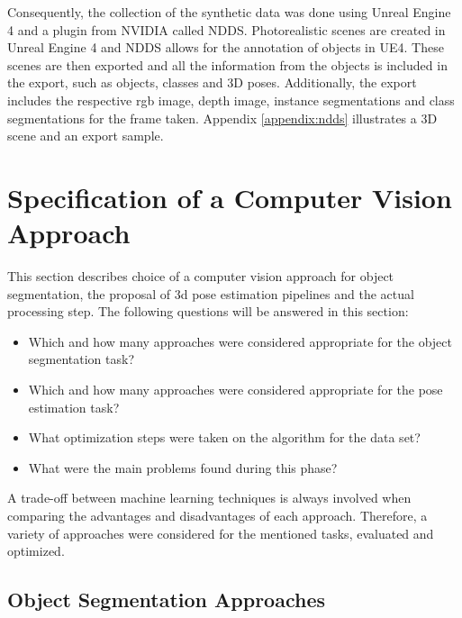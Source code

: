 Consequently, the collection of the synthetic data was done using Unreal Engine 4 and a plugin from NVIDIA\cite{2021ue4} called NDDS\cite{2021ndds}. Photorealistic scenes are created in Unreal Engine 4 and NDDS allows for the annotation of objects in UE4. These scenes are then exported and all the information from the objects is included in the export, such as objects, classes and 3D poses. Additionally, the export includes the respective rgb image, depth image, instance segmentations and class segmentations for the frame taken. Appendix \ref{appendix:ndds} illustrates a 3D scene and an export sample.

\section{Specification of a Computer Vision Approach}\label{chap:3:method}

This section describes choice of a computer vision approach for object segmentation, the proposal of 3d pose estimation pipelines and the actual processing step. The following questions will be answered in this section:
\begin{itemize}
    \item Which and how many approaches were considered appropriate for the object segmentation task?
    \item Which and how many approaches were considered appropriate for the pose estimation task?
    \item What optimization steps were taken on the algorithm for the data set?
    \item What were the main problems found during this phase?
\end{itemize}
A trade-off between machine learning techniques is always involved when comparing the advantages and disadvantages of each approach. Therefore, a variety of approaches were considered for the mentioned tasks, evaluated and optimized.

\subsection{Object Segmentation Approaches}

